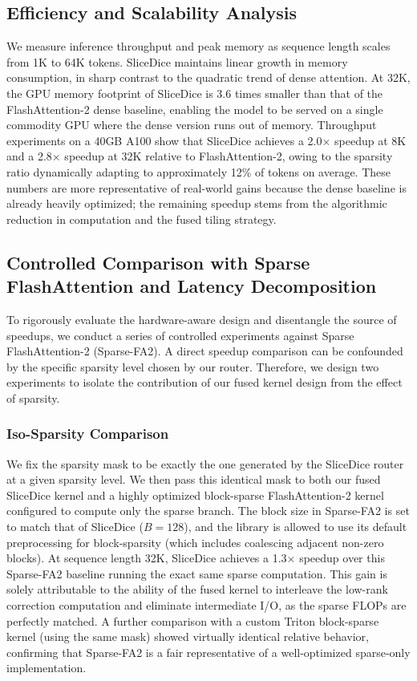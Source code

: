 \documentclass{article}
\begin{document}
\subsection{Efficiency and Scalability Analysis}

We measure inference throughput and peak memory as sequence length scales from 1K to 64K tokens. SliceDice maintains linear growth in memory consumption, in sharp contrast to the quadratic trend of dense attention. At 32K, the GPU memory footprint of SliceDice is 3.6 times smaller than that of the FlashAttention-2 dense baseline, enabling the model to be served on a single commodity GPU where the dense version runs out of memory. Throughput experiments on a 40GB A100 show that SliceDice achieves a 2.0$\times$ speedup at 8K and a 2.8$\times$ speedup at 32K relative to FlashAttention-2, owing to the sparsity ratio dynamically adapting to approximately 12\% of tokens on average. These numbers are more representative of real-world gains because the dense baseline is already heavily optimized; the remaining speedup stems from the algorithmic reduction in computation and the fused tiling strategy.

\subsection{Controlled Comparison with Sparse FlashAttention and Latency Decomposition}

To rigorously evaluate the hardware-aware design and disentangle the source of speedups, we conduct a series of controlled experiments against Sparse FlashAttention-2 (Sparse-FA2). A direct speedup comparison can be confounded by the specific sparsity level chosen by our router. Therefore, we design two experiments to isolate the contribution of our fused kernel design from the effect of sparsity.

\subsubsection{Iso-Sparsity Comparison}
We fix the sparsity mask to be exactly the one generated by the SliceDice router at a given sparsity level. We then pass this identical mask to both our fused SliceDice kernel and a highly optimized block-sparse FlashAttention-2 kernel configured to compute only the sparse branch. The block size in Sparse-FA2 is set to match that of SliceDice ($B=128$), and the library is allowed to use its default preprocessing for block-sparsity (which includes coalescing adjacent non-zero blocks). At sequence length 32K, SliceDice achieves a 1.3$\times$ speedup over this Sparse-FA2 baseline running the exact same sparse computation. This gain is solely attributable to the ability of the fused kernel to interleave the low-rank correction computation and eliminate intermediate I/O, as the sparse FLOPs are perfectly matched. A further comparison with a custom Triton block-sparse kernel (using the same mask) showed virtually identical relative behavior, confirming that Sparse-FA2 is a fair representative of a well-optimized sparse-only implementation.
\end{document}
